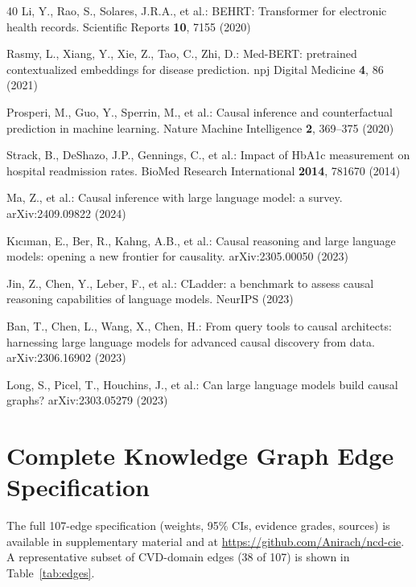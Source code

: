 \documentclass[runningheads]{llncs}
\begin{document}
\begin{thebibliography}{40}
Li, Y., Rao, S., Solares, J.R.A., et al.:
BEHRT: Transformer for electronic health records.
Scientific Reports \textbf{10}, 7155 (2020)

Rasmy, L., Xiang, Y., Xie, Z., Tao, C., Zhi, D.:
Med-BERT: pretrained contextualized embeddings for disease prediction.
npj Digital Medicine \textbf{4}, 86 (2021)

Prosperi, M., Guo, Y., Sperrin, M., et al.:
Causal inference and counterfactual prediction in machine learning.
Nature Machine Intelligence \textbf{2}, 369--375 (2020)

Strack, B., DeShazo, J.P., Gennings, C., et al.:
Impact of HbA1c measurement on hospital readmission rates.
BioMed Research International \textbf{2014}, 781670 (2014)

Ma, Z., et al.:
Causal inference with large language model: a survey.
arXiv:2409.09822 (2024)

K{\i}c{\i}man, E., Ber, R., Kahng, A.B., et al.:
Causal reasoning and large language models: opening a new frontier
for causality.
arXiv:2305.00050 (2023)

Jin, Z., Chen, Y., Leber, F., et al.:
CLadder: a benchmark to assess causal reasoning capabilities of
language models.
NeurIPS (2023)

Ban, T., Chen, L., Wang, X., Chen, H.:
From query tools to causal architects: harnessing large language
models for advanced causal discovery from data.
arXiv:2306.16902 (2023)

Long, S., Picel, T., Houchins, J., et al.:
Can large language models build causal graphs?
arXiv:2303.05279 (2023)

\end{thebibliography}

\appendix
\section{Complete Knowledge Graph Edge Specification}\label{app:edges}

The full 107-edge specification (weights, 95\% CIs, evidence grades,
sources) is available in supplementary material and at
\url{https://github.com/Anirach/ncd-cie}.
A representative subset of CVD-domain edges (38 of 107) is shown in
Table~\ref{tab:edges}.
\end{document}
